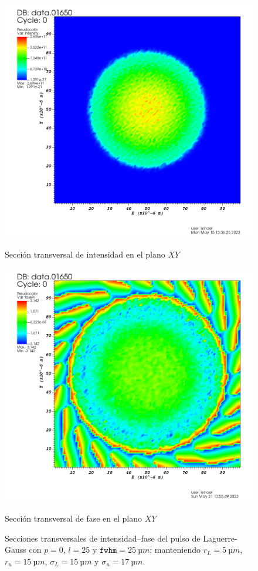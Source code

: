 \begin{figure}[htbp]
  \centering
  \begin{subcaptionblock}{.4\textwidth}
    \centering
    \includegraphics[width=\textwidth]{Figuras/ch4_oam5.png}
    \caption{Sección transversal de intensidad en el plano $XY$}\label{fig:ch4_oam5}
  \end{subcaptionblock}
  \begin{subcaptionblock}{.4\textwidth}
    \centering
    \includegraphics[width=\textwidth]{Figuras/ch4_oam6.png}
    \caption{Sección transversal de fase en el plano $XY$}\label{fig:ch4_oam6}
  \end{subcaptionblock}
   \caption{Secciones transversales de intensidad--fase del pulso de Laguerre-Gauss con $p=0$, $l=25$ y $\texttt{fwhm}=\qty{25}{µm}$; manteniendo $r_{L}=\qty{5}{µm}$, $r_{u}=\qty{15}{µm}$, $\sigma_{L}=\qty{15}{µm}$ y $\sigma_{u}=\qty{17}{µm}$.}
   \label{fig:4.36}
\end{figure}

